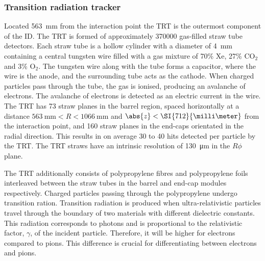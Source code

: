 \subsubsection{Transition radiation tracker}
Located \SI{563}{\milli\meter} from the interaction point the TRT is the outermost component of the ID. The TRT is formed of approximately 370000 gas-filled straw tube detectors. Each straw tube is a hollow cylinder with a diameter of \SI{4}{\milli\meter} containing a central tungsten wire filled with a gas mixture of 70\% Xe, 27\% CO$_{2}$ and 3\% O$_{2}$. The tungsten wire along with the tube forms a capacitor, where the wire is the anode, and the surrounding tube acts as the cathode. When charged particles pass through the tube, the gas is ionised, producing an avalanche of electrons. The avalanche of electrons is detected as an electric current in the wire. The TRT has 73 straw planes in the barrel region, spaced horizontally at a distance $\SI{563}{\milli\meter} < R < \SI{1066}{\milli\meter}$ and $\abs{z} < \SI{712}{\milli\meter}$ from the interaction point, and 160 straw planes in the end-caps orientated in the radial direction. This results in on average 30 to 40 hits detected per particle by the TRT. The TRT straws have an intrinsic resolution of \SI{130}{\micro\meter} in the $R\phi$ plane. 

The TRT additionally consists of polypropylene fibres and polypropylene foils interleaved between the straw tubes in the barrel and end-cap modules respectively. Charged particles passing through the polypropylene undergo transition ration. Transition radiation is produced when ultra-relativistic particles travel through the boundary of two materials with different dielectric constants. This radiation corresponds to photons and is proportional to the relativistic factor, $\gamma$, of the incident particle. Therefore, it will be higher for electrons compared to pions. This difference is crucial for differentiating between electrons and pions. 



